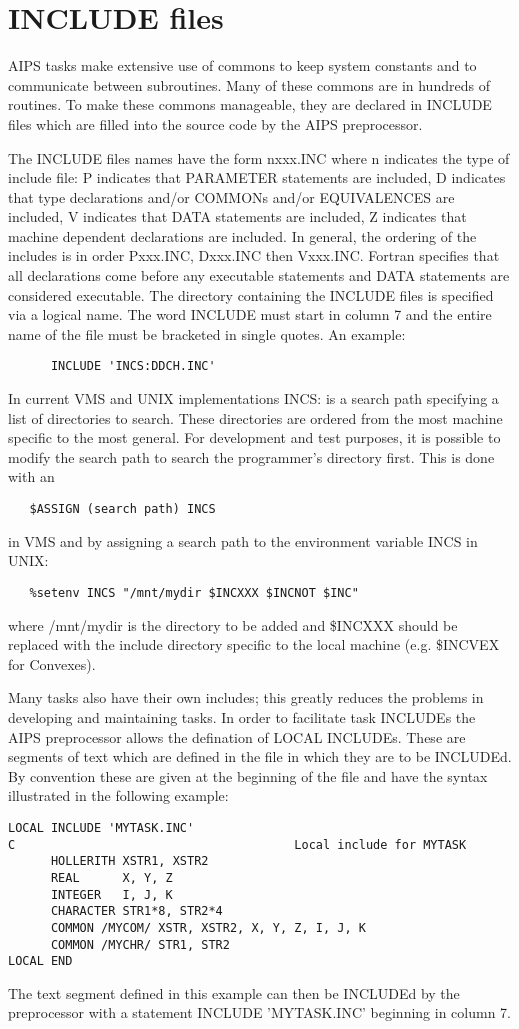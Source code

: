 \section{INCLUDE files}
 AIPS tasks make extensive use of commons to keep system constants and
to communicate between subroutines.  Many of these commons are in
hundreds of routines.  To make these commons manageable, they are
declared in INCLUDE files which are filled into the source code by the
AIPS preprocessor.

The INCLUDE files names have the form nxxx.INC where n indicates the
type of include file: P indicates that PARAMETER statements are
included, D indicates that type declarations and/or COMMONs and/or
EQUIVALENCES are included, V indicates that DATA statements are
included, Z indicates that machine dependent declarations are
included.  In general, the ordering of the includes is in order
Pxxx.INC, Dxxx.INC then Vxxx.INC.  Fortran specifies that all
declarations come before any executable statements and DATA statements
are considered executable.  The directory containing the INCLUDE files
is specified via a logical name. The word INCLUDE must start in column
7 and the entire name of the file must be bracketed in single quotes.
An example:
\begin{verbatim}
      INCLUDE 'INCS:DDCH.INC'
\end{verbatim}
In current VMS and UNIX implementations INCS: is a search path
specifying a list of directories to search.  These directories are
ordered from the most machine specific to the most general.  For
development and test purposes, it is possible to modify the search
path to search the programmer's directory first.  This is done with an
\begin{verbatim}
   $ASSIGN (search path) INCS
\end{verbatim}
in VMS and by assigning a search path to the environment variable INCS
in UNIX:
\begin{verbatim}
   %setenv INCS "/mnt/mydir $INCXXX $INCNOT $INC"
\end{verbatim}
where /mnt/mydir is the directory to be added and \$INCXXX should be
replaced with the include directory specific to the local machine
(e.g. \$INCVEX for Convexes).

Many tasks also have their own includes; this greatly reduces the
problems in developing and maintaining tasks.  In order to facilitate
task INCLUDEs the AIPS preprocessor allows the defination of LOCAL
INCLUDEs.  These are segments of text which are defined in the file in
which they are to be INCLUDEd.  By convention these are given at the
beginning of the file and have the syntax illustrated in the following
example:
\begin{verbatim}
LOCAL INCLUDE 'MYTASK.INC'
C                                       Local include for MYTASK
      HOLLERITH XSTR1, XSTR2
      REAL      X, Y, Z
      INTEGER   I, J, K
      CHARACTER STR1*8, STR2*4
      COMMON /MYCOM/ XSTR, XSTR2, X, Y, Z, I, J, K
      COMMON /MYCHR/ STR1, STR2
LOCAL END
\end{verbatim}
The text segment defined in this example can then be INCLUDEd by the
preprocessor with a statement INCLUDE 'MYTASK.INC' beginning in
column 7.

